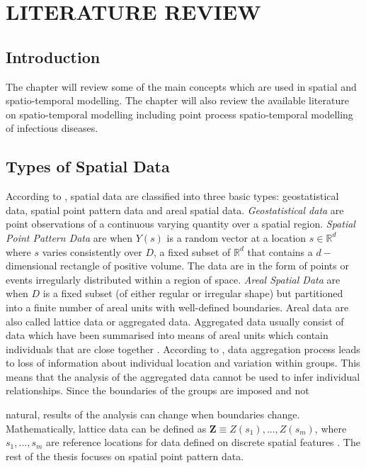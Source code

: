 
\chapter{LITERATURE REVIEW}

\section{Introduction}

The chapter will review some of the main concepts which are used in spatial and spatio-temporal modelling. The chapter will also review the available literature on spatio-temporal modelling including point process spatio-temporal modelling of infectious diseases.

\section{Types of Spatial Data}

According to \citet{Cressie:2015}, spatial data are classified into three basic types: geostatistical data, spatial point pattern data and areal spatial data. \textit{Geostatistical data} are point observations of a continuous varying quantity over a spatial region. \textit{Spatial Point Pattern Data} are when $Y(s)$ is a random vector at a location $s \in \mathbb{R}^d$ where $s$ varies consistently over $D$, a fixed subset of $\mathbb{R}^d$ that contains a $d-$dimensional rectangle of positive volume. The data are in the form of points or events irregularly distributed within a region of space. \textit{Areal Spatial Data} are when $D$ is a fixed subset (of either regular or irregular shape) but partitioned into a finite number of areal units with well-defined boundaries. Areal data are also called lattice data or aggregated data. Aggregated data usually consist of data which have been summarised into means of areal units which contain individuals that are close together \citep{Cressie:2015}. According to \citet{Tranmer:1998}, data aggregation process leads to loss of information about individual location and variation within groups. This means that the analysis of the aggregated data cannot be used to infer individual relationships. Since the boundaries of the groups are imposed and not 

\restoregeometry


natural, results of the analysis can change when boundaries change. Mathematically, lattice data can be defined as $\textbf{Z} \equiv {Z(s_1),...,Z(s_m)}$, where ${s_1,...,s_m}$ are reference locations for data defined on discrete spatial features \citep{Cressie:2015}.  The rest of the thesis focuses on spatial point pattern data.

